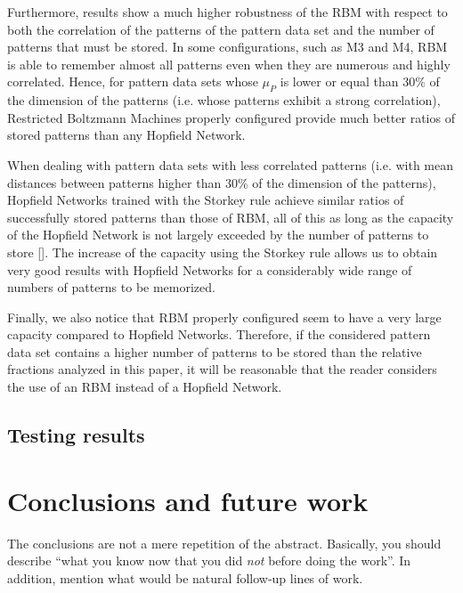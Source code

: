 \documentclass[anon]{CI}
\begin{document}
Furthermore, results show a much higher robustness of the RBM with respect to both the correlation of the patterns of the pattern data set and the number of patterns that must be stored. In some configurations, such as M3 and M4, RBM is able to remember almost all patterns even when they are numerous and highly correlated. Hence, for pattern data sets whose $\mu_P$ is lower or equal than $ 30\% $ of the dimension of the patterns (i.e. whose patterns exhibit a strong correlation), Restricted Boltzmann Machines properly configured provide much better ratios of stored patterns than any Hopfield Network.

When dealing with pattern data sets with less correlated patterns (i.e. with mean distances between patterns higher than $30\%$ of the dimension of the patterns), Hopfield Networks trained with the Storkey rule achieve similar ratios of successfully stored patterns than those of RBM, all of this as long as the capacity of the Hopfield Network is not largely exceeded by the number of patterns to store [\cite{Storkey1997}]. The increase of the capacity using the Storkey rule allows us to obtain very good results with Hopfield Networks for a considerably wide range of numbers of patterns to be memorized.

Finally, we also notice that RBM properly configured seem to have a very large capacity compared to Hopfield Networks. Therefore, if the considered pattern data set contains a higher number of patterns to be stored than the relative fractions analyzed in this paper, it will be reasonable that the reader considers the use of an RBM instead of a Hopfield Network.

\subsection{Testing results}


\section{Conclusions and future work}

The conclusions are not a mere repetition of the abstract. Basically, you should describe ``what you know now that you did \emph{not} before doing the work''. In addition, mention what would be natural follow-up lines of work.

\end{document}

